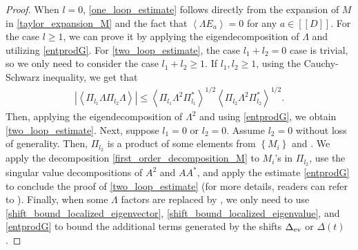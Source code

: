 \documentclass[10pt,reqno]{amsart}
\numberwithin{equation}{section}
\numberwithin{figure}{section}
\theoremstyle{plain} %
\theoremstyle{definition} %
\newcommand{\wh}{\widehat}
\newcommand{\wt}{\widetilde}
\renewcommand{\txt}[1]{\text{\rm{#1}}}
\renewcommand{\leq}{\le}
\renewcommand{\geq}{\ge}
\newcommand{\qq}[1]{[\![{#1}]\!]}
\newcommand{\pa}[1]{\left({#1}\right)}
\newcommand{\ha}[1]{\left\{{#1}\right\}}
\newcommand{\absa}[1]{\left\lvert #1 \right\rvert}
\newcommand{\avga}[1]{\left\langle #1 \right\rangle}
\newcommand{\tLambda}{{\wt{\Lambda}}}
\newcommand{\hLambda}{{\wh{\Lambda}}}
\numberwithin{equation}{section}
\begin{document}
\begin{proof}
    When $l=0$, \eqref{one_loop_estimate} follows directly from the expansion of $M$ in \eqref{taylor_expansion_M} and the fact that $\avga{\Lambda E_{a}}=0$ for any $a\in \qq{D}$. For the case $l\ge 1$, we can prove it by applying the eigendecomposition of $\Lambda$ and utilizing \eqref{entprodG}. 
    For \eqref{two_loop_estimate}, the case $l_1+l_2=0$ case is trivial, so we only need to consider the case $l_1+l_2\geq 1$. If $l_1,l_2\geq 1$, using the Cauchy-Schwarz inequality, we get that 
    \begin{equation}\nonumber
        \begin{aligned}
            \absa{\left\langle\Pi_{l_1} \Lambda \Pi_{l_2} \Lambda\right\rangle}\leq \left\langle\Pi_{l_1} \Lambda^2 \Pi_{l_1}^*\right\rangle^{1/2}\left\langle\Pi_{l_2} \Lambda^2 \Pi_{l_2}^*\right\rangle^{1/2}.
        \end{aligned}
    \end{equation}
    Then, applying the eigendecomposition of $\Lambda^2$ and using \eqref{entprodG}, we obtain \eqref{two_loop_estimate}. 
    Next, suppose $l_1=0$ or $l_2=0$. Assume $l_2=0$ without loss of generality. Then, $\Pi_{l_2}$ is a product of some elements from $\ha{M_i}$ and \smash{$\ha{E_a}_{a=1}^D$}. We apply the decomposition \eqref{first_order_decomposition_M} to $M_i$'s in $\Pi_{l_2}$, use the singular value decompositions of $A^2$ and $AA^*$, and apply the estimate \eqref{entprodG} to conclude the proof of \eqref{two_loop_estimate} (for more details, readers can refer to \cite[equation (8.25)-(8.31)]{stone2024randommatrixmodelquantum}).
   Finally, when some $\Lambda$ factors are replaced by \smash{$\tLambda$ or $\hLambda_t$}, 
   we only need to use \eqref{shift_bound_localized_eigenvector}, \eqref{shift_bound_localized_eigenvalue}, and \eqref{entprodG} to bound the additional terms generated by the shifts $\Delta_{\txt{ev}}$ or $\Delta\pa{t}$.
\end{proof}

%
%
\end{document}
